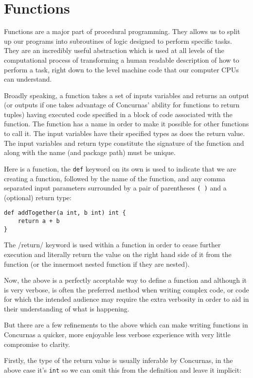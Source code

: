 \documentclass[conc-doc]{subfiles}
\begin{document}
	
	\chapter[Functions]{Functions}
	
Functions are a major part of procedural programming. They allows us to split up our programs into subroutines of logic designed to perform specific tasks. They are an incredibly useful abstraction which is used at all levels of the computational process of transforming a human readable description of how to perform a task, right down to the level machine code that our computer CPUs can understand.

Broadly speaking, a function takes a set of inputs variables and returns an output (or outputs if one takes advantage of Concurnas' ability for functions to return tuples) having executed code specified in a block of code associated with the function. The function has a name in order to make it possible for other functions to call it. The input variables have their specified types as does the return value. The input variables and return type constitute the signature of the function and along with the name (and package path) must be unique.

Here is a function, the \lstinline{def} keyword on its own is used to indicate that we are creating a function, followed by the name of the function, and any comma separated input parameters surrounded by a pair of parentheses \lstinline{( )} and a (optional) return type:

\begin{lstlisting}
def addTogether(a int, b int) int {
	return a + b
}
\end{lstlisting}

The /return/ keyword is used within a function in order to cease further execution and literally return the value on the right hand side of it from the function (or the innermost nested function if they are nested).

Now, the above is a perfectly acceptable way to define a function and although it is very verbose, is often the preferred method when writing complex code, or code for which the intended audience may require the extra verbosity in order to aid in their understanding of what is happening.

But there are a few refinements to the above which can make writing functions in Concurnas a quicker, more enjoyable less verbose experience with very little compromise to clarity.

Firstly, the type of the return value is usually inferable by Concurnas, in the above case it's \lstinline{int} so we can omit this from the definition and leave it implicit:
\end{document}
